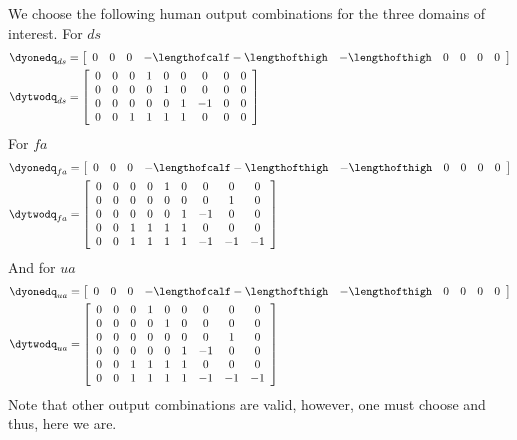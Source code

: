 \begin{myexample}
 We choose the following human output combinations for the three domains of interest. For $ds$
 \begin{align}
 \nonumber
  \dyonedq_{ds} &= \left[ \begin{array}{c c c c c c c c c}
  0 &0 &0 & -\lengthofcalf -\lengthofthigh & -\lengthofthigh& 0 & 0 & 0 & 0
 \end{array}\right] \\
  \dytwodq_{ds} &= \left[ \begin{array}{c c c c c c c c c}
  0 &0 &0 & 1 & 0 & 0 & 0 & 0 & 0  \\
  0 &0 &0 & 0 & 1 & 0 & 0 & 0 & 0\\
  0 &0 &0 & 0 & 0 & 1 & -1 & 0 & 0\\
  0 &0 &1 & 1 & 1 & 1 & 0 & 0 & 0
 \end{array}\right]
 \end{align}
For $fa$
 \begin{align}
 \nonumber
  \dyonedq_{fa} &= \left[ \begin{array}{c c c c c c c c c}
  0 &0 &0 & -\lengthofcalf -\lengthofthigh & -\lengthofthigh& 0 & 0 & 0 & 0
 \end{array}\right] \\
  \dytwodq_{fa} &= \left[ \begin{array}{c c c c c c c c c}
  0 &0 &0 & 0 & 1 & 0 & 0 & 0 & 0  \\
  0 &0 &0 & 0 & 0 & 0 & 0 & 1 & 0\\
  0 &0 &0 & 0 & 0 & 1 & -1 & 0 & 0\\
  0 &0 &1 & 1 & 1 & 1 & 0 & 0 & 0\\
  0 &0 &1 & 1 & 1 & 1 & -1 & -1 & -1\\
 \end{array}\right]
 \end{align}
And for $ua$
 \begin{align}
 \nonumber
  \dyonedq_{ua} &= \left[ \begin{array}{c c c c c c c c c}
  0 &0 &0 & -\lengthofcalf -\lengthofthigh & -\lengthofthigh& 0 & 0 & 0 & 0
 \end{array}\right] \\
  \dytwodq_{ua} &= \left[ \begin{array}{c c c c c c c c c}
  0 &0 &0 & 1 & 0 & 0 & 0 & 0 & 0  \\
  0 &0 &0 & 0 & 1 & 0 & 0 & 0 & 0  \\
  0 &0 &0 & 0 & 0 & 0 & 0 & 1 & 0\\
  0 &0 &0 & 0 & 0 & 1 & -1 & 0 & 0\\
  0 &0 &1 & 1 & 1 & 1 & 0 & 0 & 0\\
  0 &0 &1 & 1 & 1 & 1 & -1 & -1 & -1\\
 \end{array}\right]
 \end{align}
Note that other output combinations are valid, however, one must choose and thus, here we are.
\end{myexample}


